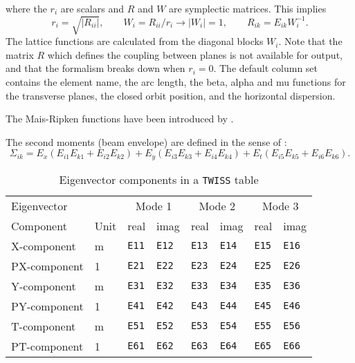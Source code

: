 where the $r_i$ are scalars and $R$ and $W$ are symplectic matrices.
This implies
\[
r_i = \sqrt{|R_{ii}|}, \qquad
W_i = R_{ii} / r_i \rightarrow |W_i| = 1, \qquad 
R_{ik} = E_{ik} W_i^{-1}.
\]
The lattice functions are calculated from the diagonal blocks $W_i$.
Note that the matrix $R$ which defines the coupling between planes is
not available for output,
and that the formalism breaks down when $r_i=0$.
The default column set contains the element name,
the arc length, the beta, alpha and mu functions for the transverse
planes,
the closed orbit position, and the horizontal dispersion.

The Mais-Ripken functions have been introduced by
.

The second moments (beam envelope) are defined in the sense of
: 
\[
  \Sigma_{ik} = E_x ( E_{i1} E_{k1} + E_{i2} E_{k2}) +
                E_y ( E_{i3} E_{k3} + E_{i4} E_{k4}) +
                E_t ( E_{i5} E_{k5} + E_{i6} E_{k6}).
\]

\begin{table}[Ht]
  \caption{Eigenvector components in a \texttt{TWISS} table}
  \label{tab:twiss-eig}
  \begin{center}
    \begin{tabular}{|l|l|l|l|l|l|l|l|}
      \hline
      Eigenvector & &
      \multicolumn{2}{c|}{Mode 1} &
      \multicolumn{2}{c|}{Mode 2} &
      \multicolumn{2}{c|}{Mode 3} \\
      Component & Unit & real & imag & real & imag & real & imag \\
      \hline
      X-component & m &
      \texttt{E11}\index{E11} & \texttt{E12}\index{E12} &
      \texttt{E13}\index{E13} & \texttt{E14}\index{E14} &
      \texttt{E15}\index{E15} & \texttt{E16}\index{E16} \\
      PX-component & 1 &
      \texttt{E21}\index{E21} & \texttt{E22}\index{E22} &
      \texttt{E23}\index{E23} & \texttt{E24}\index{E24} &
      \texttt{E25}\index{E25} & \texttt{E26}\index{E26} \\
      Y-component & m &
      \texttt{E31}\index{E31} & \texttt{E32}\index{E32} &
      \texttt{E33}\index{E33} & \texttt{E34}\index{E34} &
      \texttt{E35}\index{E35} & \texttt{E36}\index{E36} \\
      PY-component & 1 &
      \texttt{E41}\index{E41} & \texttt{E42}\index{E42} &
      \texttt{E43}\index{E43} & \texttt{E44}\index{E44} &
      \texttt{E45}\index{E45} & \texttt{E46}\index{E46} \\
      T-component & m &
      \texttt{E51}\index{E51} & \texttt{E52}\index{E52} &
      \texttt{E53}\index{E53} & \texttt{E54}\index{E54} &
      \texttt{E55}\index{E55} & \texttt{E56}\index{E56} \\
      PT-component & 1 &
      \texttt{E61}\index{E61} & \texttt{E62}\index{E62} &
      \texttt{E63}\index{E63} & \texttt{E64}\index{E64} &
      \texttt{E65}\index{E65} & \texttt{E66}\index{E66} \\
      \hline                  
    \end{tabular}
  \end{center}
\end{table}


